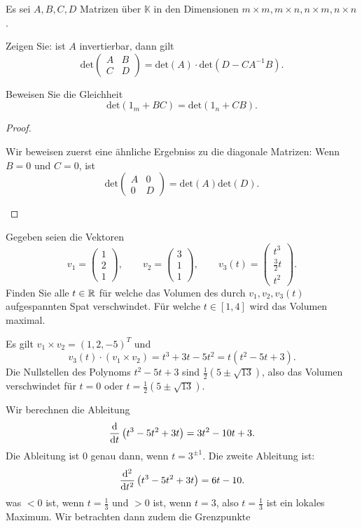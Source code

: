 \begin{Problem}
	Es sei $A,B,C,D$ Matrizen \"{u}ber $\mathbb{K}$ in den Dimensionen $m\times m, m \times n, n \times m, n \times n$. 
	\begin{parts}
	\item Zeigen Sie: ist $A$ invertierbar, dann gilt
		\[
			\text{det}\begin{pmatrix} A & B \\ C & D \end{pmatrix} =\text{det}(A)\cdot \text{det}(D-CA^{-1}B)
		.\] 
	\item Beweisen Sie die Gleichheit
		\[
			\text{det}(1_m+BC)=\text{det}(1_n+CB)
		.\] 
	\end{parts}
\end{Problem}
\begin{proof}
	\begin{parts}
	\item Wir beweisen zuerst eine ähnliche Ergebniss zu die diagonale Matrizen: Wenn $B=0$ und $C=0$, ist
		 \[
			 \text{det}\begin{pmatrix} A & 0 \\ 0 & D \end{pmatrix} = \text{det}(A)\text{det}(D)
		.\] 
	\end{parts}
\end{proof}
\begin{Problem}
	Gegeben seien die Vektoren
	\[
	v_1=\begin{pmatrix} 1 \\ 2 \\ 1 \end{pmatrix} , \qquad v_2=\begin{pmatrix} 3 \\ 1 \\ 1 \end{pmatrix} , \qquad v_3(t)=\begin{pmatrix} t^3 \\ \frac{3}{2}t \\ t^2 \end{pmatrix} 
	.\] 
	Finden Sie alle $t\in \mathbb{R}$ f\"{u}r welche das Volumen des durch $v_1,v_2,v_3(t)$ aufgespannten Spat verschwindet. F\"{u}r welche $t\in [1,4]$ wird das Volumen maximal.
\end{Problem}
\begin{Problem}
	Es gilt $v_1\times v_2= (1,2,-5)^T$ und
	\[
	v_3(t)\cdot (v_1\times v_2)=t^3+3t-5t^2=t(t^2-5t+3)
	.\] 
	Die Nullstellen des Polynoms $t^2-5t+3$ sind $\frac{1}{2}(5\pm \sqrt{13} )$, also das Volumen verschwindet f\"{u}r $t=0$ oder $t=\frac{1}{2}(5\pm \sqrt{13} )$. 

	Wir berechnen die Ableitung
	\[
		\dv{t}\left( t^3-5t^2+3t \right) =3t^2-10t+3
	.\]
	Die Ableitung ist $0$ genau dann, wenn $t=3^{\pm 1}$. Die zweite Ableitung ist:
	 \[
		 \dv[2]{t}\left( t^3-5t^2+3t \right) =6t-10
	.\] 
	was $<0$ ist, wenn $t=\frac{1}{3}$ und $>0$ ist, wenn $t=3$, also $t=\frac{1}{3}$ ist ein lokales Maximum. Wir betrachten dann zudem die Grenzpunkte
\end{Problem}
